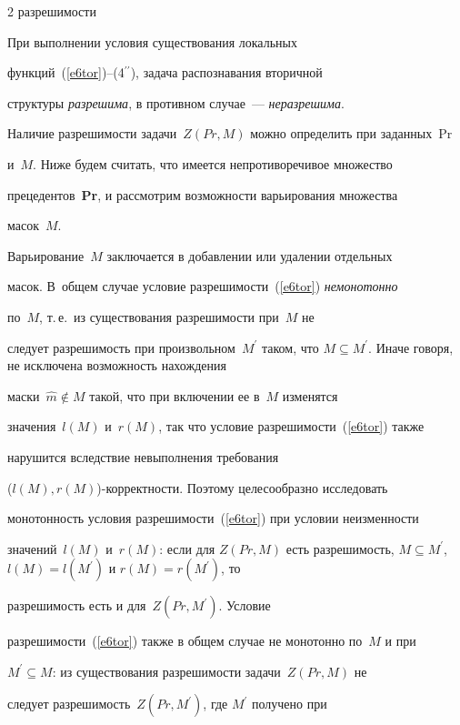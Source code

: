 \begin{multicols}{2}
{разрешимости}



При выполнении условия существования локальных 

функций~(\ref{e6tor})--(4$^{\prime\prime}$), задача распознавания вторичной 

структуры \textit{разрешима}, в противном случае~--- \textit{неразрешима}. 

Наличие разрешимости задачи~$Z(Pr,M)$ можно определить при заданных~Pr 

и~$M$. Ниже будем считать, что имеется непротиворечивое множество 

прецедентов~\textbf{Pr},  и рассмотрим возможности варьирования множества 

масок~$M$. 



    Варьирование~$M$ заключается в добавлении или удалении отдельных 

масок. В~общем случае условие разрешимости~(\ref{e6tor}) \textit{немонотонно} 

по~$M$, т.\,е.\ из существования разрешимости при~$M$ не 

следует разрешимость при произвольном~$M^\prime$ таком, что $M\subseteq 

M^\prime$. Иначе говоря, не исключена возможность нахождения 

маски~$\hat{m} \notin M$ такой, что при включении ее в~$M$ изменятся 

значения~$l(M)$ и~$r(M)$, так что условие разрешимости~(\ref{e6tor}) также 

нарушится вследствие невыполнения требования 

($l(M),r(M)$)-кор\-рект\-ности. Поэтому целесообразно исследовать 

монотонность условия раз\-ре\-ши\-мости~(\ref{e6tor}) при условии неизменности 

значений~$l(M)$ и~$r(M)$: если для $Z(Pr, M)$ есть разрешимость, $M 

\subseteq M^\prime$, $l(M)= l(M^\prime)$ и $r(M)= r(M^\prime)$, то 

разрешимость есть и для~$Z(Pr, M^\prime)$. Условие 

раз\-ре\-ши\-мости~(\ref{e6tor}) также в общем случае не монотонно по~$M$ и при 

$M^\prime \subseteq M$:  из существования разрешимости задачи~$Z(Pr, M)$ не 

следует разрешимость~$Z(Pr, M^\prime)$, где $M^\prime$ получено при 


\end{multicols}
